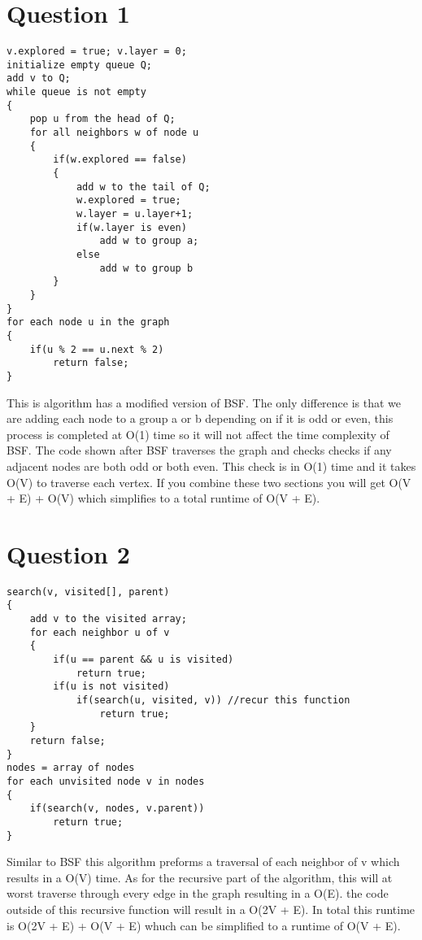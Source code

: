 \documentclass[11pt]{book}
\begin{document}
\maketitle


\section*{Question 1}
\begin{lstlisting}
v.explored = true; v.layer = 0;
initialize empty queue Q;
add v to Q;
while queue is not empty
{
	pop u from the head of Q;
	for all neighbors w of node u
	{
		if(w.explored == false)
		{
			add w to the tail of Q;
			w.explored = true;
			w.layer = u.layer+1;
			if(w.layer is even)
				add w to group a;
			else
				add w to group b
		}
	}
}
for each node u in the graph
{
	if(u % 2 == u.next % 2)
		return false;
}
\end{lstlisting}
This is algorithm has a modified version of BSF. The only 
difference is that we are adding each node to a group a or b
depending on if it is odd or even, this process is completed at
O(1) time so it will not affect the time complexity of BSF. 
The code shown after BSF traverses the graph and checks checks 
if any adjacent nodes are both odd or both even. This check is 
in O(1) time and it takes O(V) to traverse each vertex.
If you combine these two sections you will get O(V + E) + O(V)
which simplifies to a total runtime of O(V + E).


\newpage
\section*{Question 2}
\begin{lstlisting}
search(v, visited[], parent)
{
	add v to the visited array;
	for each neighbor u of v
	{
		if(u == parent && u is visited)
			return true;
		if(u is not visited)
			if(search(u, visited, v)) //recur this function
				return true;
	}
	return false;
}
nodes = array of nodes
for each unvisited node v in nodes
{
	if(search(v, nodes, v.parent))
		return true;
}
\end{lstlisting}
Similar to BSF this algorithm preforms a traversal of each
neighbor of v which results in a O(V) time. As for the recursive
part of the algorithm, this will at worst traverse through every 
edge in the graph resulting in a O(E). the code outside of this recursive
function will result in a O(2V + E). In total this runtime is O(2V + E) + O(V + E)
whuch can be simplified to a runtime of O(V + E).
\end{document}
